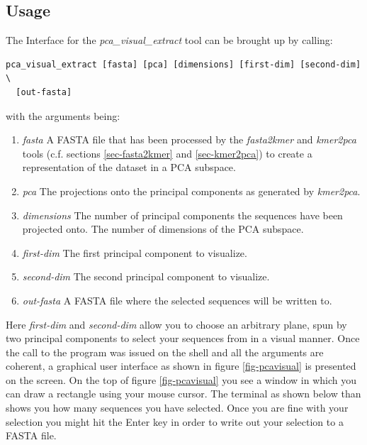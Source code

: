 \subsection{Usage}
The Interface for the \emph{pca\_visual\_extract} tool can be brought
up by calling:
\begin{lstlisting}
pca_visual_extract [fasta] [pca] [dimensions] [first-dim] [second-dim] \
  [out-fasta]
\end{lstlisting}
with the arguments being:
\begin{enumerate}
  \item \emph{fasta} A FASTA file that has been processed by the
    \emph{fasta2kmer} and \emph{kmer2pca} tools (c.f. sections
    \ref{sec-fasta2kmer} and \ref{sec-kmer2pca}) to create a
    representation of the dataset in a PCA subspace.
  \item \emph{pca} The projections onto the principal components as
    generated by \emph{kmer2pca}.
  \item \emph{dimensions} The number of principal components the
    sequences have been projected onto. The number of dimensions of
    the PCA subspace.
  \item \emph{first-dim} The first principal component to visualize.
  \item \emph{second-dim} The second principal component to visualize.
  \item \emph{out-fasta} A FASTA file where the selected sequences
    will be written to. 
\end{enumerate}
Here \emph{first-dim} and \emph{second-dim} allow you to choose an
arbitrary plane, spun by two principal components to select your
sequences from in a visual manner. Once the call to the program was issued
on the shell and all the arguments are coherent, a graphical user
interface as shown in figure \ref{fig-pcavisual} is presented on the
screen. On the top of figure \ref{fig-pcavisual} you see a
window in which you can draw a rectangle using your mouse
cursor. The terminal as shown below than shows you how many
sequences you have selected. Once you are fine with your
selection you might hit the Enter key in order to write out your
selection to a FASTA file.

